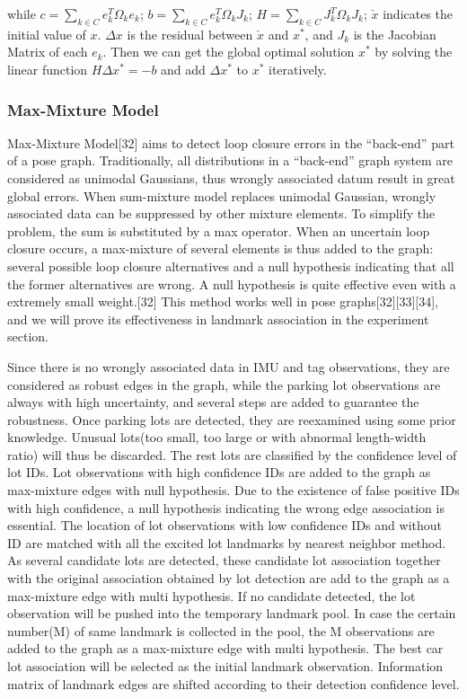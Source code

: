\documentclass[journal]{IEEEtran}
\begin{document}
while $c=\sum\limits_{k \in C}e_k^T \Omega_k e_k$; $b=\sum\limits_{k \in C}e_k^T \Omega_k J_k$; $H=\sum\limits_{k \in C}J_k^T \Omega_k J_k$; $\check{x}$ indicates the initial value of ${x}$. $\Delta x$ is the residual between $\check{x}$  and $x^*$, and $J_k$ is the Jacobian Matrix of each $e_k$. Then we can get the global optimal solution $x^*$ by solving the linear function $H\Delta x^*=-b$ and add $\Delta x^*$ to $x^*$ iteratively.

\subsubsection{Max-Mixture Model}
Max-Mixture Model[32] aims to detect loop closure errors in the “back-end” part of a pose graph. Traditionally, all distributions in a “back-end” graph system are considered as unimodal Gaussians, thus wrongly associated datum result in great global errors. When sum-mixture model replaces unimodal Gaussian, wrongly associated data can be suppressed by other mixture elements. To simplify the problem, the sum is substituted by a max operator. When an uncertain loop closure occurs, a max-mixture of several elements is thus added to the graph: several possible loop closure alternatives and a null hypothesis indicating that all the former alternatives are wrong. A null hypothesis is quite effective even with a extremely small weight.[32] This method works well in pose graphs[32][33][34], and we will prove its effectiveness in landmark association in the experiment section.

Since there is no wrongly associated data in IMU and tag observations, they are considered as robust edges in the graph, while the parking lot observations are always with high uncertainty, and several steps are added to guarantee the robustness. Once parking lots are detected, they are   reexamined using some prior knowledge. Unusual lots(too small, too large or with abnormal length-width ratio) will thus be discarded. The rest lots are classified by the confidence level of lot IDs. Lot observations with high confidence IDs are added to the graph as max-mixture edges with null hypothesis. Due to the existence of false positive IDs with high confidence, a null hypothesis indicating the wrong edge association is essential. The location of lot observations with low confidence IDs and without ID are matched with all the excited lot landmarks by nearest neighbor method. As several candidate lots are detected, these candidate lot association together with the original association obtained by lot detection are add to the graph as a max-mixture edge with multi hypothesis. If no candidate detected, the lot observation will be pushed into the temporary landmark pool. In case the certain number(M) of same landmark is collected in the pool, the M observations are added to the graph as a max-mixture edge with multi hypothesis. The best car lot association will be selected as the initial landmark observation. Information matrix of landmark edges are shifted according to their detection confidence level.
\end{document}
